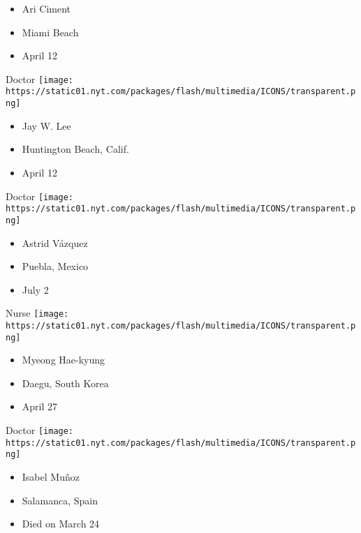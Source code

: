 \begin{itemize}
\tightlist
\item
  Ari Ciment
\item
  Miami Beach
\item
  April 12
\end{itemize}

\protect\hyperlink{item-jay-w-lee}{}

Doctor
\texttt{[image: https://static01.nyt.com/packages/flash/multimedia/ICONS/transparent.png]}

\begin{itemize}
\tightlist
\item
  Jay W. Lee
\item
  Huntington Beach, Calif.
\item
  April 12
\end{itemize}

\protect\hyperlink{item-astrid-vazquez}{}

Doctor
\texttt{[image: https://static01.nyt.com/packages/flash/multimedia/ICONS/transparent.png]}

\begin{itemize}
\tightlist
\item
  Astrid Vázquez
\item
  Puebla, Mexico
\item
  July 2
\end{itemize}

\protect\hyperlink{item-myeong-hae-kyung}{}

Nurse
\texttt{[image: https://static01.nyt.com/packages/flash/multimedia/ICONS/transparent.png]}

\begin{itemize}
\tightlist
\item
  Myeong Hae-kyung
\item
  Daegu, South Korea
\item
  April 27
\end{itemize}

\protect\hyperlink{item-isabel-munoz}{}

Doctor
\texttt{[image: https://static01.nyt.com/packages/flash/multimedia/ICONS/transparent.png]}

\begin{itemize}
\tightlist
\item
  Isabel Muñoz
\item
  Salamanca, Spain
\item
  Died on March 24
\end{itemize}

